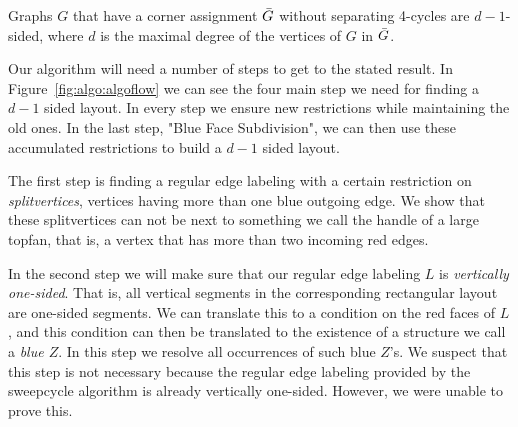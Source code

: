  \begin{thrm}
  \label{th:dsided}
  Graphs $G$ that have a corner assignment $\bar{G}$ without separating 4-cycles are $d-1$-sided, where $d$ is the maximal degree of the vertices of $G$ in $\bar{G}$.
  \end{thrm}

  Our algorithm will need a number of steps to get to the stated result. In Figure~\ref{fig:algo:algoflow} we can see the four main step we need for finding a $d-1$ sided layout. In every step we ensure new restrictions while maintaining the old ones. In the last step, "Blue Face Subdivision", we can then use these accumulated restrictions to build a $d-1$ sided layout.

  The first step is finding a regular edge labeling with a certain restriction on \emph{splitvertices}, vertices having more than one blue outgoing edge.
  We show that these splitvertices can not be next to something we call the handle of a large topfan, that is, a vertex that has more than two incoming red edges.

  In the second step we will make sure that our regular edge labeling $L$ is \emph{vertically one-sided}. That is, all vertical segments in the corresponding rectangular layout are one-sided segments.
  We can translate this to a condition on the red faces of $L$, and this condition can then be translated to the existence of a structure we call a \emph{blue $Z$}. In this step we resolve all occurrences of such blue $Z$'s.
  We suspect that this step is not necessary because the regular edge labeling provided by the sweepcycle algorithm is already vertically one-sided. However, we were unable to prove this.

